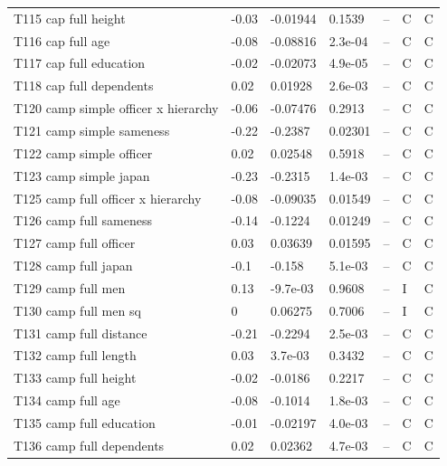 {\begin{longtable}{@{}p{.245\linewidth}p{.17\linewidth}p{.17\linewidth}p{.085\linewidth}p{.060\linewidth}p{.08\linewidth}p{.07\linewidth}@{}}
T115 cap full height & -0.03 & -0.01944 & 0.1539 & -- & C & C\\
T116 cap full age & -0.08 & -0.08816 & 2.3e-04 & -- & C & C\\
T117 cap full education & -0.02 & -0.02073 & 4.9e-05 & -- & C & C\\
T118 cap full dependents & 0.02 & 0.01928 & 2.6e-03 & -- & C & C\\
T120 camp simple officer x hierarchy & -0.06 & -0.07476 & 0.2913 & -- & C & C\\
T121 camp simple sameness & -0.22 & -0.2387 & 0.02301 & -- & C & C\\
T122 camp simple officer & 0.02 & 0.02548 & 0.5918 & -- & C & C\\
T123 camp simple japan & -0.23 & -0.2315 & 1.4e-03 & -- & C & C\\
T125 camp full officer x hierarchy & -0.08 & -0.09035 & 0.01549 & -- & C & C\\
T126 camp full sameness & -0.14 & -0.1224 & 0.01249 & -- & C & C\\
T127 camp full officer & 0.03 & 0.03639 & 0.01595 & -- & C & C\\
T128 camp full japan & -0.1 & -0.158 & 5.1e-03 & -- & C & C\\
T129 camp full men & 0.13 & -9.7e-03 & 0.9608 & -- & I & C\\
T130 camp full men sq & 0 & 0.06275 & 0.7006 & -- & I & C\\
T131 camp full distance & -0.21 & -0.2294 & 2.5e-03 & -- & C & C\\
T132 camp full length & 0.03 & 3.7e-03 & 0.3432 & -- & C & C\\
T133 camp full height & -0.02 & -0.0186 & 0.2217 & -- & C & C\\
T134 camp full age & -0.08 & -0.1014 & 1.8e-03 & -- & C & C\\
T135 camp full education & -0.01 & -0.02197 & 4.0e-03 & -- & C & C\\
T136 camp full dependents & 0.02 & 0.02362 & 4.7e-03 & -- & C & C\\
\end{longtable}}
